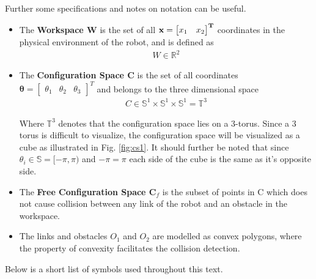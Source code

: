 Further some specifications and notes on notation can be useful. 
\begin{itemize} 

 \item The \textbf{Workspace W} is the set of all $\bf x = \begin{bmatrix} x_1 & x_2  \end{bmatrix}^T$ coordinates in the physical environment of the robot, and is defined as
\begin{align}
\label{eq:}
 W \in \mathbb{R}^2
 \end{align}

\item The \textbf{Configuration Space C} is the set of all  coordinates $\boldsymbol{ \theta } =  \begin{bmatrix} \theta_1 & \theta_2 & \theta_3  \end{bmatrix}^T$  and belongs to the three dimensional space 
\begin{align}
\label{eq:}
 C \in \mathbb{S}^1 \times \mathbb{S}^1 \times\mathbb{S}^1 = \mathbb{T}^3 
 \end{align}

Where $ \mathbb{T}^3 $ denotes that the configuration space lies on a 3-torus. Since a 3 torus is difficult to visualize, the configuration space will be visualized as a cube as illustrated in Fig. \ref{fig:cs1}. It should further be noted that since $\theta_i  \in \mathbb{S} = [ -\pi , \pi )$ and $-\pi=\pi$ each side of the cube is the same as it's opposite side.

\item The \textbf{Free Configuration Space $ \mathbf C_f$} is the subset of points in C which  does not cause collision between any link of the robot and an obstacle in the workspace.

\item The links and obstacles $O_1 $ and $O_2$ are modelled as convex polygons, where the property of convexity facilitates the collision detection.

 \end{itemize}

Below is a short list of symbols used throughout this text.


